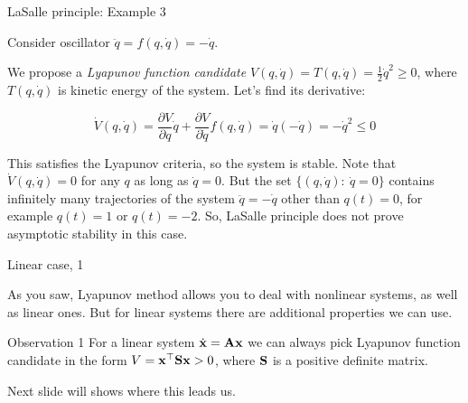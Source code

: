 \documentclass{beamer}
\begin{document}
\begin{frame}{LaSalle principle: Example 3}
	\begin{flushleft}
		
		Consider oscillator $\ddot{q} = f(q, \dot{q}) = -\dot{q}$. 
		
		\bigskip
		
		We propose a \emph{Lyapunov function candidate} $V(q, \dot{q}) = T(q, \dot{q}) = \frac{1}{2} \dot{q}^2 \geq 0$, where $T(q, \dot{q})$ is kinetic energy of the system. Let's find its derivative:
		
		\begin{equation}
			\dot V(q, \dot{q}) = 
			\frac{\partial V}{\partial q}       \dot{q} +
			\frac{\partial V}{\partial \dot{q}} f(q, \dot{q}) = 
			\dot{q} (-\dot{q}) = -\dot{q}^2 \leq 0
		\end{equation}
		
		
		This satisfies the Lyapunov criteria, so the system is stable. Note that $\dot V(q, \dot{q}) = 0$ for any $q$ as long as $\dot{q} = 0$. But the set $\{(q, \dot{q}): \   \dot{q} = 0 \}$ contains infinitely many trajectories of the system $\ddot{q} = -\dot{q}$ other than $q(t) = 0$, for example $q(t) = 1$ or $q(t) = -2$. So, LaSalle principle does not prove asymptotic stability in this case.
		
	\end{flushleft}
\end{frame}


%		
%		






\begin{frame}{Linear case, 1}
\begin{flushleft}

As you saw, Lyapunov method allows you to deal with nonlinear systems, as well as linear ones. But for linear systems there are additional properties we can use.

\bigskip

\begin{block}{Observation 1}
For a linear system $\dot{\mathbf{x}} = \mathbf{A}\mathbf{x}$ we can always pick Lyapunov function candidate in the form $V = \mathbf{x}^\top\mathbf{S}\mathbf{x} > 0$, where $\mathbf{S}$ is a positive definite matrix.
\end{block}

\bigskip

Next slide will shows where this leads us.

\end{flushleft}
\end{frame}
\end{document}
